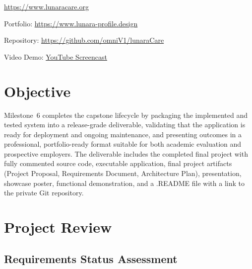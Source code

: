 \documentclass[12pt,letterpaper]{article}
\begin{document}
\begin{center}
{\color{LunaraBlue!80}\normalsize \url{https://www.lunaracare.org}}

\vspace{0.15cm}

{\color{LunaraBlue!80}\normalsize Portfolio: \url{https://www.lunara-profile.design}}

\vspace{0.15cm}

{\color{LunaraBlue!80}\normalsize Repository: \url{https://github.com/omniV1/lunaraCare}}

\vspace{0.15cm}

{\color{LunaraBlue!80}\normalsize Video Demo: \href{https://www.youtube.com/watch?v=EY6ncwOMFUQ}{YouTube Screencast}}

\end{center}

\newpage

\thispagestyle{fancy}
\tableofcontents
\newpage

\section{Objective}

Milestone~6 completes the capstone lifecycle by packaging the implemented and tested system into a release-grade deliverable, validating that the application is ready for deployment and ongoing maintenance, and presenting outcomes in a professional, portfolio-ready format suitable for both academic evaluation and prospective employers. The deliverable includes the completed final project with fully commented source code, executable application, final project artifacts (Project Proposal, Requirements Document, Architecture Plan), presentation, showcase poster, functional demonstration, and a .README file with a link to the private Git repository.

\newpage

\section{Project Review}

\subsection{Requirements Status Assessment}
\end{document}
